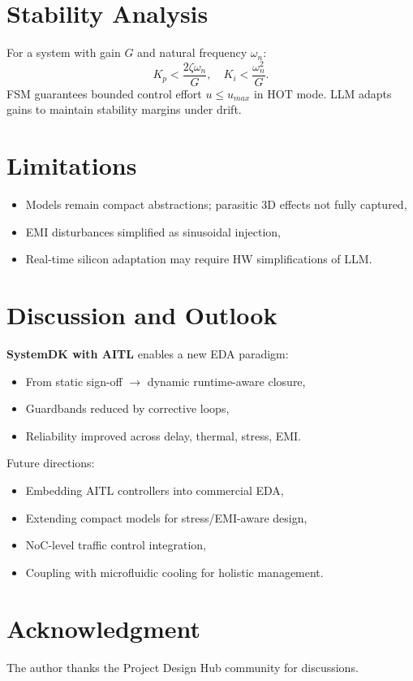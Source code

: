 \documentclass[conference]{IEEEtran}
\begin{document}
\section{Stability Analysis}
For a system with gain $G$ and natural frequency $\omega_n$:
\begin{equation}
K_p < \frac{2\zeta\omega_n}{G}, \quad K_i < \frac{\omega_n^2}{G}.
\end{equation}
FSM guarantees bounded control effort $u \leq u_{max}$ in HOT mode.  
LLM adapts gains to maintain stability margins under drift.

\section{Limitations}
\begin{itemize}
  \item Models remain compact abstractions; parasitic 3D effects not fully captured,
  \item EMI disturbances simplified as sinusoidal injection,
  \item Real-time silicon adaptation may require HW simplifications of LLM.
\end{itemize}

\section{Discussion and Outlook}
\textbf{SystemDK with AITL} enables a new EDA paradigm:
\begin{itemize}
  \item From static sign-off $\to$ dynamic runtime-aware closure,
  \item Guardbands reduced by corrective loops,
  \item Reliability improved across delay, thermal, stress, EMI.
\end{itemize}

Future directions:
\begin{itemize}
  \item Embedding AITL controllers into commercial EDA,
  \item Extending compact models for stress/EMI-aware design,
  \item NoC-level traffic control integration,
  \item Coupling with microfluidic cooling for holistic management.
\end{itemize}

\section*{Acknowledgment}
The author thanks the Project Design Hub community for discussions.
\end{document}
